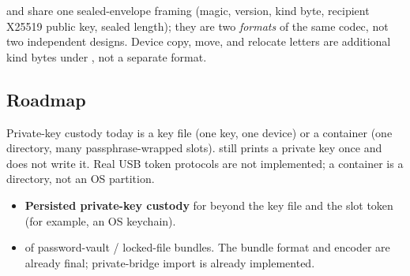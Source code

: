 \begin{noteBox}
 and  share one sealed-envelope framing (magic,
version, kind byte, recipient X25519 public key, sealed length); they are
two \emph{formats} of the same codec, not two independent designs. Device
copy, move, and relocate letters are additional  kind bytes
under , not a separate format.
\end{noteBox}

\subsection{Roadmap}

Private-key custody today is a key file (one key, one device) or a
 container (one directory, many passphrase-wrapped
slots).  still prints a private key once and does not write
it. Real USB token protocols are not implemented; a container is a
directory, not an OS partition.

\begin{itemize}
  \item \textbf{Persisted private-key custody} for  beyond
  the key file and the slot token (for example, an OS keychain).
  \item \textbf{} of password-vault / locked-file
   bundles. The bundle format and encoder are already final;
  private-bridge  import is already implemented.
\end{itemize}
